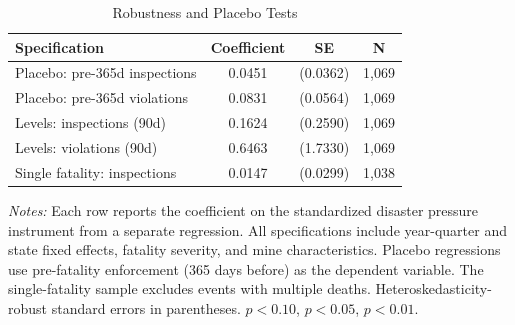 \begin{table}[H]
\centering
\caption{Robustness and Placebo Tests}
\begin{threeparttable}
\begin{tabular}{lccc}
\toprule
Specification & Coefficient & SE & N \\
\midrule
Placebo: pre-365d inspections & 0.0451 & (0.0362) & 1,069 \\
Placebo: pre-365d violations & 0.0831 & (0.0564) & 1,069 \\
Levels: inspections (90d) & 0.1624 & (0.2590) & 1,069 \\
Levels: violations (90d) & 0.6463 & (1.7330) & 1,069 \\
Single fatality: inspections & 0.0147 & (0.0299) & 1,038 \\
\bottomrule
\end{tabular}
\begin{tablenotes}[flushleft]
\small
\item \textit{Notes:} Each row reports the coefficient on the standardized disaster pressure instrument from a separate regression. All specifications include year-quarter and state fixed effects, fatality severity, and mine characteristics. Placebo regressions use pre-fatality enforcement (365 days before) as the dependent variable. The single-fatality sample excludes events with multiple deaths. Heteroskedasticity-robust standard errors in parentheses. \sym{*} \(p<0.10\), \sym{**} \(p<0.05\), \sym{***} \(p<0.01\).
\end{tablenotes}
\end{threeparttable}
\label{tab:robustness}
\end{table}

